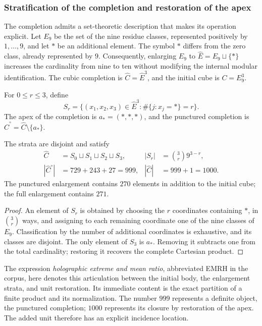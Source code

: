 \subsubsection{Stratification of the completion and restoration of the apex}
\label{sec:revision-emrh}

The completion admits a set-theoretic description that makes its operation
explicit. Let \(E_9\) be the set of the nine residue classes, represented
positively by \(1,\ldots,9\), and let \(\ast\) be an additional element.
The symbol \(\ast\) differs from the zero class, already represented by \(9\).
Consequently, enlarging \(E_9\) to
\(\widehat E=E_9\sqcup\{\ast\}\) increases the cardinality from nine to ten
without modifying the internal modular identification. The cubic completion is
\(\widehat C=\widehat E^3\), and the initial cube is \(C=E_9^3\).

\begin{definition}
For \(0\leq r\leq3\), define
\[
 S_r=\{(x_1,x_2,x_3)\in\widehat E^3:
             \#\{j:x_j=\ast\}=r\}.
\]
The apex of the completion is \(a_\ast=(\ast,\ast,\ast)\), and the
punctured completion is \(\widehat C^{\circ}=\widehat C\setminus\{a_\ast\}\).
\end{definition}

\begin{proposition}
The strata are disjoint and satisfy
\begin{align}
 \widehat C&=S_0\sqcup S_1\sqcup S_2\sqcup S_3,
 &|S_r|&=\binom3r9^{3-r},\label{eq:revision-estratos}\\
 |\widehat C^{\circ}|&=729+243+27=999,
 &|\widehat C|&=999+1=1000.\label{eq:revision-999}
\end{align}
The punctured enlargement contains \(270\) elements in addition to the initial
cube; the full enlargement contains \(271\).
\end{proposition}
\begin{proof}
An element of \(S_r\) is obtained by choosing the \(r\) coordinates
containing \(\ast\), in \(\binom3r\) ways, and assigning to each remaining
coordinate one of the nine classes of \(E_9\). Classification by the number
of additional coordinates is exhaustive, and its classes are disjoint. The only
element of \(S_3\) is \(a_\ast\). Removing it subtracts one from the total
cardinality; restoring it recovers the complete Cartesian product.
\end{proof}

The expression \emph{holographic extreme and mean ratio}, abbreviated EMRH in
the corpus, here denotes this articulation between the initial body, the
enlargement strata, and unit restoration. Its immediate content
is the exact partition of a finite product and its normalization. The number
\(999\) represents a definite object, the punctured completion;
\(1000\) represents its closure by restoration of the apex. The added
unit therefore has an explicit incidence location.

